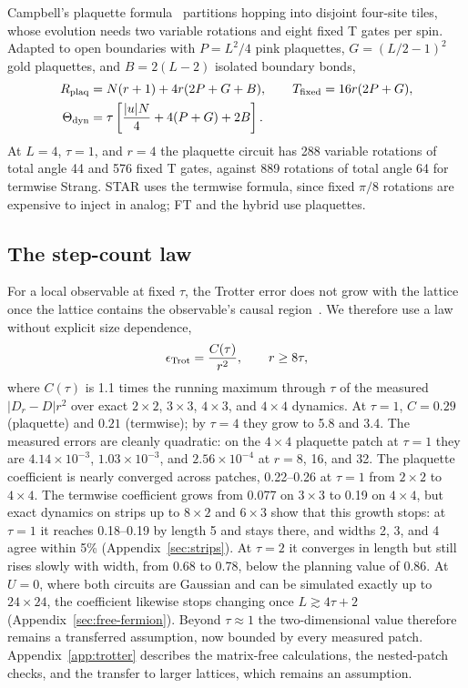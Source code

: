 \documentclass[11pt]{article}
\newcommand{\eps}{\epsilon}
\begin{document}
Campbell's plaquette formula~\cite{campbell} partitions hopping into disjoint
four-site tiles, whose evolution needs two variable rotations and eight fixed
T gates per spin. Adapted to open boundaries with $P=L^2/4$ pink plaquettes,
$G=(L/2-1)^2$ gold plaquettes, and $B=2(L-2)$ isolated boundary bonds,
\begin{align}
 R_{\rm plaq}&=N(r+1)+4r(2P+G+B),\qquad T_{\rm fixed}=16r(2P+G),\label{eq:plaq}\\
 \Theta_{\rm dyn}&=\tau\left[\frac{|u|N}{4}+4(P+G)+2B\right].\label{eq:plaqangle}
\end{align}
At $L=4$, $\tau=1$, and $r=4$ the plaquette circuit has 288 variable rotations
of total angle 44 and 576 fixed T gates, against 889 rotations of total angle
64 for termwise Strang. STAR uses the termwise formula, since fixed $\pi/8$
rotations are expensive to inject in analog; FT and the hybrid use plaquettes.

\subsection{The step-count law}
For a local observable at fixed $\tau$, the Trotter error does not grow with
the lattice once the lattice contains the observable's causal
region~\cite{childs2021trotter}. We therefore use a law without explicit size
dependence,
\begin{equation}\label{eq:trotter}
 \eps_{\rm Trot}=\frac{C(\tau)}{r^2},\qquad r\geq8\tau,
\end{equation}
where $C(\tau)$ is 1.1 times the running maximum through $\tau$ of the measured
$|D_r-D|r^2$ over exact $2\times2$, $3\times3$, $4\times3$, and $4\times4$
dynamics. At $\tau=1$, $C=0.29$ (plaquette) and $0.21$ (termwise); by $\tau=4$
they grow to 5.8 and 3.4. The measured errors are cleanly quadratic: on the
$4\times4$ plaquette patch at $\tau=1$ they are $4.14\times10^{-3}$,
$1.03\times10^{-3}$, and $2.56\times10^{-4}$ at $r=8$, 16, and 32. The plaquette
coefficient is nearly converged across patches, 0.22--0.26 at $\tau=1$ from
$2\times2$ to $4\times4$. The termwise coefficient grows from 0.077 on $3\times3$ to
0.19 on $4\times4$, but exact dynamics on strips up to $8\times2$ and $6\times3$ show
that this growth stops: at $\tau=1$ it reaches 0.18--0.19 by length 5 and stays
there, and widths 2, 3, and 4 agree within 5\% (Appendix~\ref{sec:strips}). At
$\tau=2$ it converges in length but still rises slowly with width, from 0.68 to
0.78, below the planning value of 0.86. At $U=0$, where both circuits are Gaussian
and can be simulated exactly up to $24\times24$, the coefficient likewise stops
changing once $L\gtrsim4\tau+2$ (Appendix~\ref{sec:free-fermion}). Beyond
$\tau\approx1$ the two-dimensional value therefore remains a transferred
assumption, now bounded by every measured patch.
Appendix~\ref{app:trotter} describes the matrix-free calculations, the
nested-patch checks, and the transfer to larger lattices, which remains an
assumption.
\end{document}
